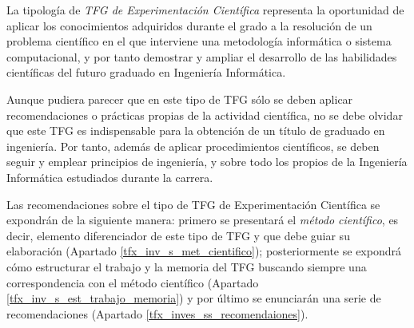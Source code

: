 La tipología de {\it TFG de Experimentación Científica} representa la oportunidad de aplicar los conocimientos adquiridos durante el grado a la resolución de un problema científico en el que interviene una metodología informática o sistema computacional, y por tanto demostrar y ampliar el desarrollo de las habilidades científicas del futuro graduado en Ingeniería Informática.

Aunque pudiera parecer que en este tipo de TFG sólo se deben aplicar recomendaciones o prácticas propias de la actividad científica, no se debe olvidar que este TFG es indispensable para la obtención de un título de graduado en ingeniería. Por tanto, además de aplicar procedimientos científicos, se deben seguir y emplear principios de ingeniería, y sobre todo los propios de la Ingeniería Informática estudiados durante la carrera.

Las recomendaciones sobre el tipo de TFG de Experimentación Científica se expondrán de la siguiente manera: primero se presentará el \textit{método científico}, es decir, elemento diferenciador de este tipo de TFG y que debe guiar su elaboración (Apartado \ref{tfx_inv_s_met_cientifico}); posteriormente se expondrá cómo estructurar el trabajo y la memoria del TFG buscando siempre una correspondencia con el método científico (Apartado \ref{tfx_inv_s_est_trabajo_memoria}) y por último se enunciarán una serie de recomendaciones (Apartado \ref{tfx_inves_ss_recomendaiones}).

